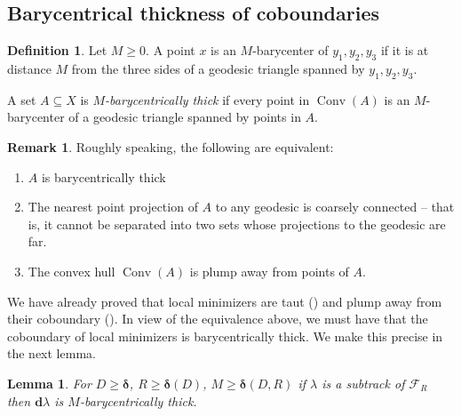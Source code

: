 \documentclass{amsart}
\numberwithin{equation}{section}
\newtheorem{lemma}[theorem]{Lemma}
\theoremstyle{definition}
\newtheorem{definition}[theorem]{Definition}
\newtheorem{remark}[theorem]{Remark}
\newcommand{\bfd}{\mathbf{d}}
\newcommand{\calF}{\mathcal{F}}
\newcommand{\bdelta}{{\boldsymbol\delta}}
\DeclareMathOperator{\conv}{Conv}
\begin{document}
\subsection{Barycentrical thickness of coboundaries}

\begin{definition}\label{def: barycenterically thick}
Let $M\ge 0$. 
A point $x$ is an $M$-barycenter of $y_1,y_2,y_3$ if it is at distance $M$ from the three sides of a geodesic triangle spanned by $y_1,y_2,y_3$.

A set $A\subseteq X$ is \emph{$M$-barycentrically thick} if 
every point in $\conv(A)$ is an $M$-barycenter of a geodesic triangle spanned by points in $A$.
\end{definition}

\begin{remark}
    Roughly speaking, the following are equivalent:
    \begin{enumerate}
        \item $A$ is barycentrically thick
        \item The nearest point projection of $A$ to any geodesic is coarsely connected -- that is, it cannot be separated into two sets whose projections to the geodesic are far.
        \item The convex hull $\conv(A)$ is plump away from points of $A$.
    \end{enumerate}
\end{remark}  

We have already proved that local minimizers are taut () and plump away from their coboundary  ().
In view of the equivalence above, we must have that the coboundary of local minimizers is barycentrically thick.
We make this precise in the next lemma.


\begin{lemma}\label{coboundary of local minimizers is thick}
    For $D\ge\bdelta$, $R\ge \bdelta(D)$, $M\ge \bdelta(D,R)$ if $\lambda$ is a subtrack of $\calF_R$ then $\bfd\lambda$ is $M$-barycentrically thick.
\end{lemma}
\end{document}
